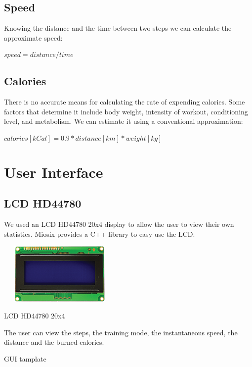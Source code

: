 \documentclass[a4paper,10pt]{article}
\makeatletter
\newenvironment{tablehere}{\def\@captype{table}\vspace{2ex}}{\vspace{1ex}}
\newenvironment{figurehere}{\def\@captype{figure}\vspace{2ex}}{\vspace{1ex}}
\makeatother
\begin{document}
\begin{multicols}{2}
\subsection{Speed}
Knowing the distance and the time between two steps we can calculate the approximate speed: \\

\centerline{$speed = distance / time$}

\subsection{Calories}
There is no accurate means for calculating the rate of expending calories. 
Some factors that determine it include body weight, intensity of workout, conditioning level, and metabolism.
We can estimate it using a conventional approximation: \\

\centerline{$calories [kCal] = 0.9 * distance [km] * weight [kg]$}

\section{User Interface}
\subsection{LCD HD44780}
We used an LCD HD44780 20x4 display to allow the user to view their own statistics. Miosix provides a C++ library to easy use the LCD.

\begin{figurehere}
 \centering
 \includegraphics[width=6cm, height=3cm]{./eps/hd44780.eps}
 \caption{LCD HD44780 20x4}
 \label{fig:hd44780}
\end{figurehere}

The user can view the steps, the training mode, the instantaneous speed, the distance and the burned calories.

\begin{tablehere}
\centering
{}
\caption{GUI tamplate}
 \label{tab:GUI}
\end{tablehere}


\end{multicols}
\end{document}
